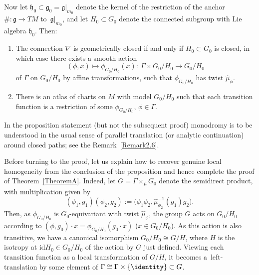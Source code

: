 \begin{PropositionBlaom}
  Now let ${\mathfrak h}_0 \subset {\mathfrak g}_0={\mathfrak g}|_{m_0}$
  denote the kernel of the restriction of the anchor $\# \colon
  \mathfrak g \rightarrow TM$ to~$\mathfrak g|_{m_0}$, and let $H_0
  \subset G_0$ denote the connected subgroup with Lie algebra
  ${\mathfrak h}_0$. Then:
  \begin{enumerate}\itemsep=0pt
  \item[$(3)$] %
  The connection $\nabla $ is geometrically closed if
    and only if $H_0 \subset G_0$ is closed, in which case there
    exists a smooth action
    \[
    (\phi,x)\mapsto \phi_{G_0/H_0}(x) \colon \
    \Gamma \times {G_0/H_0} \rightarrow {G_0/H_0}
    \] of $\Gamma $ on
    ${G_0/H_0} $ by affine transformations, such that $\phi_{G_0/H_0}
    $ has twist $\hat \mu_\phi$.
  \item[$(4)$]%
   There is an atlas of charts on $M$ with model ${G_0/H_0}$ such
    that each transition function is a restriction of some
    $\phi_{G_0/H_0}$, $\phi \in \Gamma$.
  \end{enumerate}
\end{PropositionBlaom}

\begin{RemarkBlaom}\label{Remark5.2}
  In the proposition statement (but not the subsequent proof)
  monodromy is to be understood in the usual sense of parallel
  translation (or analytic continuation) around closed paths; see the
  Remark~\ref{Remark2.6}.
\end{RemarkBlaom}

Before turning to the proof, let us explain how to recover genuine
local homogeneity from the conclusion of the proposition and hence
complete the proof of Theorem~\ref{TheoremA}. Indeed, let $G=\Gamma
\times_{\hat\mu} G_0$ denote the semidirect product, with
multiplication given by \begin{equation*}
  (\phi_1,g_1)(\phi_2,g_2):=\big( \phi_1
  \phi_2,\hat{\mu}_{\phi_2}^{-1}(g_1)g_2 \big).
\end{equation*}
Then, as $\phi_{G_0/H_0} $ is $G_0$-equivariant with twist $\hat
\mu_\phi$, the group $G$ acts on ${G_0/H_0}$ according to
$(\phi,g_0)\cdot x = \phi_{G_0/H_0}(g_0 \cdot x)$ ($x \in
G_0/H_0$). As this action is also transitive, we have a canonical
isomorphism ${G_0/H_0} \cong G/H$, where $H$ is the isotropy at $\mathrm{id} H_0
\in {G_0/H_0} $ of the action by $G$ just def\/ined. Viewing each
transition function as a local transformation of $G/H$, it becomes a~left-translation by some element of $\Gamma \cong \Gamma \times
\{\identity\}\subset G$.


